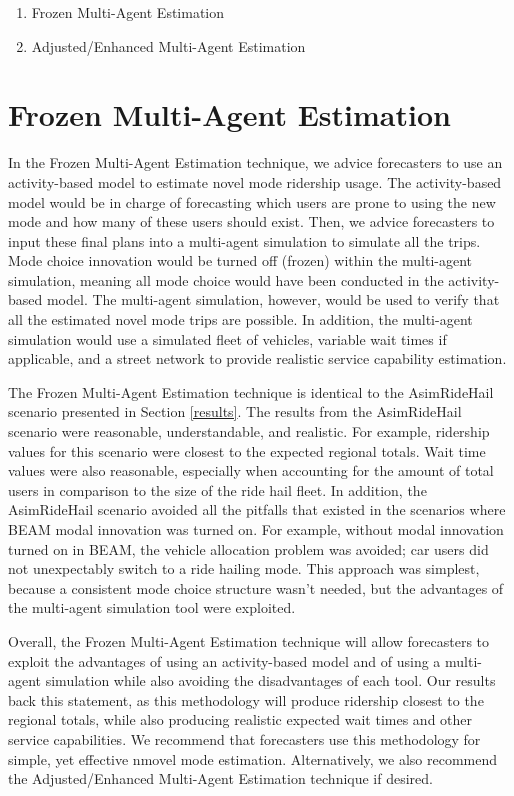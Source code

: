 \documentclass[fancy, masters]{byuthesis}
\providecommand{\tightlist}{%
  \setlength{\itemsep}{0pt}\setlength{\parskip}{0pt}}
\begin{document}
\begin{enumerate}
\def\labelenumi{\arabic{enumi}.}
\tightlist
\item
  Frozen Multi-Agent Estimation
\item
  Adjusted/Enhanced Multi-Agent Estimation
\end{enumerate}

\hypertarget{frozen-multi-agent-estimation}{%
\section{Frozen Multi-Agent Estimation}\label{frozen-multi-agent-estimation}}

In the Frozen Multi-Agent Estimation technique, we advice forecasters to use an activity-based model to estimate novel mode ridership usage. The activity-based model would be in charge of forecasting which users are prone to using the new mode and how many of these users should exist. Then, we advice forecasters to input these final plans into a multi-agent simulation to simulate all the trips. Mode choice innovation would be turned off (frozen) within the multi-agent simulation, meaning all mode choice would have been conducted in the activity-based model. The multi-agent simulation, however, would be used to verify that all the estimated novel mode trips are possible. In addition, the multi-agent simulation would use a simulated fleet of vehicles, variable wait times if applicable, and a street network to provide realistic service capability estimation.

The Frozen Multi-Agent Estimation technique is identical to the AsimRideHail scenario presented in Section \ref{results}. The results from the AsimRideHail scenario were reasonable, understandable, and realistic. For example, ridership values for this scenario were closest to the expected regional totals. Wait time values were also reasonable, especially when accounting for the amount of total users in comparison to the size of the ride hail fleet. In addition, the AsimRideHail scenario avoided all the pitfalls that existed in the scenarios where BEAM modal innovation was turned on. For example, without modal innovation turned on in BEAM, the vehicle allocation problem was avoided; car users did not unexpectably switch to a ride hailing mode. This approach was simplest, because a consistent mode choice structure wasn't needed, but the advantages of the multi-agent simulation tool were exploited.

Overall, the Frozen Multi-Agent Estimation technique will allow forecasters to exploit the advantages of using an activity-based model and of using a multi-agent simulation while also avoiding the disadvantages of each tool. Our results back this statement, as this methodology will produce ridership closest to the regional totals, while also producing realistic expected wait times and other service capabilities. We recommend that forecasters use this methodology for simple, yet effective nmovel mode estimation. Alternatively, we also recommend the Adjusted/Enhanced Multi-Agent Estimation technique if desired.
\end{document}
